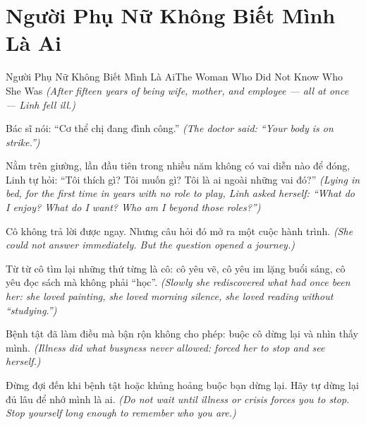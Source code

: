 \section{Người Phụ Nữ Không Biết Mình Là Ai}
\begin{truyen}{Người Phụ Nữ Không Biết Mình Là Ai}{The Woman Who Did Not Know Who She Was}
\textit{(After fifteen years of being wife, mother, and employee — all at once — Linh fell ill.)}

Bác sĩ nói: ``Cơ thể chị đang đình công.''
\textit{(The doctor said: ``Your body is on strike.'')}

Nằm trên giường, lần đầu tiên trong nhiều năm không có vai diễn nào để đóng, Linh tự hỏi: ``Tôi thích gì? Tôi muốn gì? Tôi là ai ngoài những vai đó?''
\textit{(Lying in bed, for the first time in years with no role to play, Linh asked herself: ``What do I enjoy? What do I want? Who am I beyond those roles?'')}

Cô không trả lời được ngay. Nhưng câu hỏi đó mở ra một cuộc hành trình.
\textit{(She could not answer immediately. But the question opened a journey.)}

Từ từ cô tìm lại những thứ từng là cô: cô yêu vẽ, cô yêu im lặng buổi sáng, cô yêu đọc sách mà không phải ``học''.
\textit{(Slowly she rediscovered what had once been her: she loved painting, she loved morning silence, she loved reading without ``studying.'')}

Bệnh tật đã làm điều mà bận rộn không cho phép: buộc cô dừng lại và nhìn thấy mình.
\textit{(Illness did what busyness never allowed: forced her to stop and see herself.)}

\end{truyen}

\begin{baihoc}
Đừng đợi đến khi bệnh tật hoặc khủng hoảng buộc bạn dừng lại. Hãy tự dừng lại đủ lâu để nhớ mình là ai.
\textit{(Do not wait until illness or crisis forces you to stop. Stop yourself long enough to remember who you are.)}
\end{baihoc}
\ngancach

